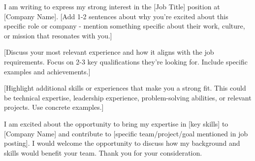 \storeletterdate{\today}
\begin{storedcvletter}{
I am writing to express my strong interest in the [Job Title] position at [Company Name]. [Add 1-2 sentences about why you're excited about this specific role or company - mention something specific about their work, culture, or mission that resonates with you.]

[Discuss your most relevant experience and how it aligns with the job requirements. Focus on 2-3 key qualifications they're looking for. Include specific examples and achievements.]

[Highlight additional skills or experiences that make you a strong fit. This could be technical expertise, leadership experience, problem-solving abilities, or relevant projects. Use concrete examples.]

I am excited about the opportunity to bring my expertise in [key skills] to [Company Name] and contribute to [specific team/project/goal mentioned in job posting]. I would welcome the opportunity to discuss how my background and skills would benefit your team. Thank you for your consideration.

}
\end{storedcvletter}


